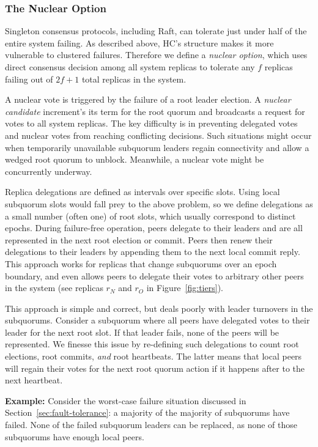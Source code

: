 \documentclass[letterpaper,10pt,twocolumn]{article}
\newcommand{\sub}{subquorum\xspace}
\newcommand{\subs}{subquorums\xspace}
\newcommand{\roo}{root quorum\xspace}
\newcommand{\para}[1]{\vspace{.04in}\noindent\textbf{#1}}
\begin{document}
\subsubsection{The Nuclear Option}
\label{sec:nuclear}
Singleton consensus protocols, including Raft, can tolerate just under half of the entire system
failing.
As described above, HC's structure makes it more vulnerable to clustered failures.
Therefore we define a \emph{nuclear option}, which uses direct consensus
decision among all system replicas to tolerate any $f$ replicas
failing out of $2f+1$ total replicas in the system.

A nuclear vote is triggered by the failure of a root leader election.
A \emph{nuclear candidate}
increment's its term for the \roo and broadcasts a request for votes to all
system replicas.
The key difficulty is in preventing delegated votes and
nuclear votes from reaching conflicting decisions.
Such situations might occur when temporarily unavailable \sub leaders regain connectivity
and allow a wedged \roo to unblock.
Meanwhile, a nuclear vote might be concurrently underway.

Replica delegations are defined as intervals over specific slots.
Using local \sub slots would fall prey to the above problem, so we define
delegations as a small number (often one) of root slots, which usually
correspond to distinct epochs.
During failure-free operation, peers delegate to their leaders and are all
represented in the next root election or commit.
Peers then renew their delegations to their leaders by appending them to the
next local commit reply.
This approach works for replicas that change \subs over an epoch
boundary, and even allows peers to delegate their votes to arbitrary other
peers in the system (see replicas $r_N$ and $r_O$ in Figure~\ref{fig:tiers}).

This approach is simple and correct, but deals poorly with leader turnovers in
the \subs.
Consider a \sub where all peers have delegated votes to their leader
for the next root slot.
If that leader fails, none of the peers will be represented.
We finesse this issue by re-defining such delegations to count
root elections, root commits, \emph{and} root heartbeats.
The latter means that local peers will regain their votes for the next \roo
action if it happens after to the next heartbeat.

\para{Example:} Consider the worst-case failure situation discussed in Section~\ref{sec:fault-tolerance}: a
majority of the majority of \subs have failed.
None of the failed \sub leaders can be replaced, as none of those \subs have
enough local peers.
\end{document}
